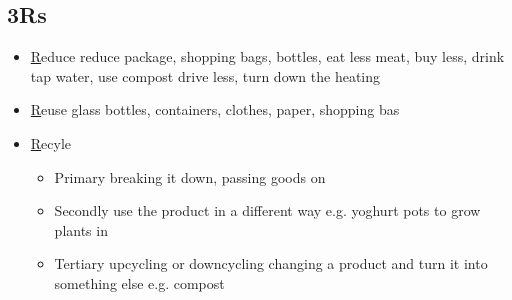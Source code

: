 \documentclass[a5paper,12pt,twoside,titlepage]{scrartcl}
\begin{document}
\subsection{3Rs} 
\begin{itemize}
	\item \underline{R}educe
	\subitem reduce package, shopping bags, bottles, 
	\subitem eat less meat, buy less, drink tap water, use compost
	\subitem drive less, turn down the heating
	\item \underline{R}euse
	\subitem glass bottles, containers, clothes, paper, shopping bas
	\item \underline{R}ecyle
	\begin{itemize}
		\item Primary
		\subitem breaking it down, passing goods on
		\item Secondly
		\subitem use the product in a different way
		\subitem e.g. yoghurt pots to grow plants in 
		\item Tertiary upcycling or downcycling
		\subitem changing a product and 
		\subitem turn it into something else
		\subitem e.g. compost
	\end{itemize}
\end{itemize}	
\end{document}
